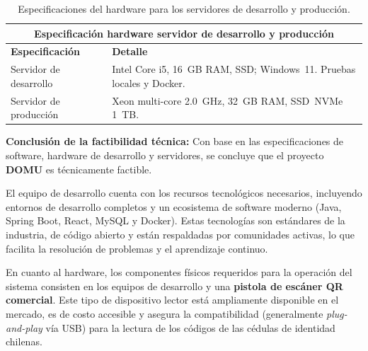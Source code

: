 \begin{table}[H]

    \centering
    
    \caption{Especificaciones del hardware para los servidores de desarrollo y producción.}
    \label{tab:hardware_servidores}
    
    \begin{tabular}{|p{}|p{}|}
    
    \hline
    \multicolumn{2}{|c|}{\textbf{Especificación hardware servidor de desarrollo y producción}}\\
    \hline
    \textbf{Especificación} & \textbf{Detalle} \\
    \hline
    
    Servidor de desarrollo & Intel Core i5, 16~GB RAM, SSD; Windows~11. Pruebas locales y Docker. \\
    \hline %
    Servidor de producción & Xeon multi-core 2.0~GHz, 32~GB RAM, SSD~NVMe 1~TB. \\
    \hline
    
    \end{tabular}
\end{table}



\textbf{Conclusión de la factibilidad técnica:} Con base en las especificaciones de software, hardware de desarrollo y servidores, se concluye que el proyecto \textbf{DOMU} es técnicamente factible.

El equipo de desarrollo cuenta con los recursos tecnológicos necesarios, incluyendo entornos de desarrollo completos y un ecosistema de software moderno (Java, Spring Boot, React, MySQL y Docker). Estas tecnologías son estándares de la industria, de código abierto y están respaldadas por comunidades activas, lo que facilita la resolución de problemas y el aprendizaje continuo.

En cuanto al hardware, los componentes físicos requeridos para la operación del sistema consisten en los equipos de desarrollo y una \textbf{pistola de escáner QR comercial}. Este tipo de dispositivo lector está ampliamente disponible en el mercado, es de costo accesible y asegura la compatibilidad (generalmente \textit{plug-and-play} vía USB) para la lectura de los códigos de las cédulas de identidad chilenas.

